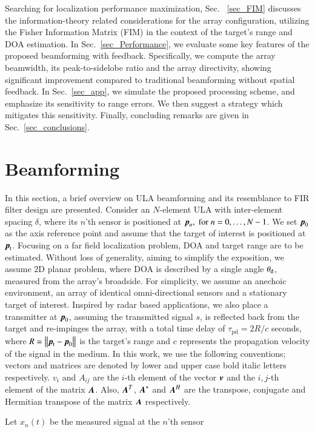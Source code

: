 Searching for localization performance maximization, Sec.~ \ref{sec_FIM} discusses the information-theory related considerations for the array configuration, utilizing the Fisher Information Matrix (FIM) in the context of the target's range and DOA estimation.
In Sec.~\ref{sec_Performance}, we evaluate some key features of the proposed beamforming with feedback. Specifically, we compute the array beamwidth, its peak-to-sidelobe ratio and the array directivity, showing significant improvement compared to traditional beamforming without spatial feedback. 
In Sec.~\ref{sec_app}, we simulate the proposed processing scheme, and emphasize its sensitivity to range errors. We then suggest a strategy which mitigates this sensitivity. Finally, concluding remarks are given in Sec.~\ref{sec_conclusions}.
\section{Beamforming}\label{sec:setup}
In this section, a brief overview on ULA beamforming and its resemblance to FIR filter design are presented.
Consider an $N$-element ULA with inter-element spacing $\delta$, where its $n$'th sensor is positioned at $\boldsymbol{p}_{n},\;\text{for}\; n=0,\ldots,N-1$. We set $\boldsymbol{p}_{0}$ as the axis reference point and assume that the target of interest is positioned at $\boldsymbol{p}_{\text{t}}$.
Focusing on a far field localization problem, DOA and target range are to be estimated. Without loss of generality, aiming to simplify the exposition, we assume $2\text{D}$ planar problem, where DOA is described by a single angle $\theta_{\text{d}}$, measured from the array's broadside.
For simplicity, we assume an anechoic environment, an array of identical omni-directional sensors and a stationary target of interest.
Inspired by radar based applications, we also place a transmitter at $\boldsymbol{p}_{0}$, assuming the transmitted signal $s$, is reflected back from the target and re-impinges the array, with a total time delay of $\tau_{\text{pd}}=2R/c$ seconds, where $R = \left\Vert\boldsymbol{p}_{\text{t}}-\boldsymbol{p}_{0}\right\Vert$ is the target's range and $c$ represents the propagation velocity of the signal in the medium.
In this work, we use the following conventions; vectors and matrices are denoted by lower and upper case bold italic letters respectively. 
$v_{i}$ and $A_{ij}$ are the $i$-th element of the vector $\boldsymbol{v}$ and the $i,j$-th element of the matrix $\boldsymbol{A}$.
Also, $\boldsymbol{A}^{T}$, $\boldsymbol{A}^{*}$ and $\boldsymbol{A}^{H}$ are the transpose, conjugate and Hermitian transpose of the matrix $\boldsymbol{A}$ respectively.
\par Let $x_{n}(t)$ be the measured signal at the $n$'th sensor
